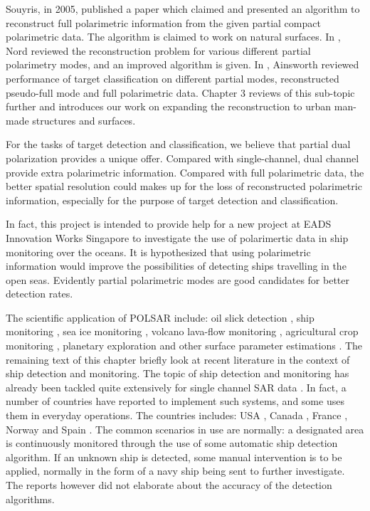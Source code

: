 Souyris, in 2005, published a paper \cite{Souyris_2005_TGRS} which claimed and presented an algorithm to reconstruct full polarimetric information from the given partial compact polarimetric data.
The algorithm is claimed to work on natural surfaces.
In \cite{Nord_2009}, Nord reviewed the reconstruction problem for various different partial polarimetry modes, and an improved algorithm is given.
In \cite{Ainsworth_2009_ISPRS}, Ainsworth reviewed performance of target classification on different partial modes, reconstructed pseudo-full mode and full polarimetric data.
Chapter 3 reviews of this sub-topic further and introduces our work on expanding the reconstruction to urban man-made structures and surfaces.

For the tasks of target detection and classification, we believe that partial dual polarization provides a unique offer.
Compared with single-channel, dual channel provide extra polarimetric information. 
Compared with full polarimetric data, the better spatial resolution could makes up for the loss of reconstructed polarimetric information, especially for the purpose of target detection and classification.

In fact, this project is intended to provide help for a new project at EADS Innovation Works Singapore to investigate the use of polarimertic data in ship monitoring over the oceans.
It is hypothesized that using polarimetric information would improve the possibilities of detecting ships travelling in the open seas.
Evidently partial polarimetric modes are good candidates for better detection rates.

The scientific application of POLSAR include: 
	oil slick detection \cite{Nunziata_2009_IGARSS, Gambardella_2007_ESASP}, 
	ship monitoring \cite{Kozai_2004_OCEANS}, 
	sea ice monitoring \cite{Wakabayashi_2004_TGRS, Nakamura_2005_IGARSS}, 
	volcano lava-flow monitoring \cite{Dierking_1998_IGARSS}, 
	agricultural crop monitoring \cite{Bouvet_2009_TGRS, Hajnsek_2008_IGARSS}, 
	planetary exploration \cite{Rosenbush_2009_JQuantSpecRadTransfer} 
	and other surface parameter estimations \cite{TruongLoi_2009_TGRS, Touzi_2009_TGRS, Hajnsek_Thesis_2001}. 
The remaining text of this chapter briefly look at recent literature in the context of ship detection and monitoring.
The topic of ship detection and monitoring has already been tackled quite extensively for single channel SAR data \cite{Tello_2005_IGARSS, Tello_2006_ISPRSJPhotogrammetryRemoteSensing}.
In fact, a number of countries have reported to implement such systems, and some uses them in everyday operations.
The countries includes: USA \cite{Montgomery_1998_IGARSS}, Canada \cite{Vachon_2000_JHUApplPhysics}, France \cite{Losekoot_2005_IGARSS}, Norway \cite{weydahl_2007_RemoteSenseGISGeology} and Spain \cite{Margarit_2009_RemoteSensing}.
The common scenarios in use are normally: 
	a designated area is continuously monitored through the use of some automatic ship detection algorithm.
If an unknown ship is detected, some manual intervention is to be applied, normally in the form of a navy ship being sent to further investigate.
The reports however did not elaborate about the accuracy of the detection algorithms.


